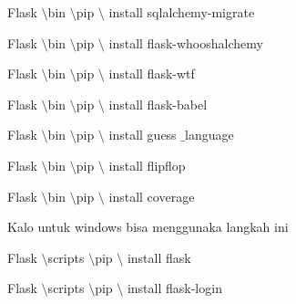 \vspace{14pt}
\noindent 
{\fontsize{14pt}{14pt}\selectfont Flask $  \setminus  $bin $  \setminus  $pip $  \setminus  $ install sqlalchemy-migrate \\} \par
\vspace{14pt}
\noindent 
{\fontsize{14pt}{14pt}\selectfont Flask $  \setminus  $bin $  \setminus  $pip $  \setminus  $ install flask-whooshalchemy \\} \par
\vspace{14pt}
\noindent 
{\fontsize{14pt}{14pt}\selectfont Flask $  \setminus $bin $  \setminus  $pip $  \setminus  $ install flask-wtf \\} \par
\vspace{14pt}
\noindent 
{\fontsize{14pt}{14pt}\selectfont Flask $  \setminus  $bin $  \setminus  $pip $  \setminus  $ install flask-babel \\} \par
\vspace{14pt}
\noindent 
{\fontsize{14pt}{14pt}\selectfont Flask $  \setminus  $bin $  \setminus  $pip $  \setminus  $ install guess $  \_  $language \\} \par
\vspace{14pt}
\noindent 
{\fontsize{14pt}{14pt}\selectfont Flask $  \setminus  $bin $  \setminus  $pip $  \setminus  $ install flipflop \\} \par
\vspace{14pt}
\noindent 
{\fontsize{14pt}{14pt}\selectfont Flask $  \setminus  $bin $  \setminus  $pip $  \setminus  $ install coverage \\} \par
\vspace{14pt}
\noindent 
{\fontsize{14pt}{14pt}\selectfont Kalo untuk windows bisa menggunaka langkah ini \\} \par
\vspace{14pt}
\noindent 
{\fontsize{14pt}{14pt}\selectfont Flask $  \setminus  $scripts $  \setminus  $pip $  \setminus  $ install flask \\} \par
\vspace{14pt}
\noindent 
{\fontsize{14pt}{14pt}\selectfont Flask $  \setminus  $scripts $  \setminus  $pip $  \setminus  $ install flask-login \\} \par
